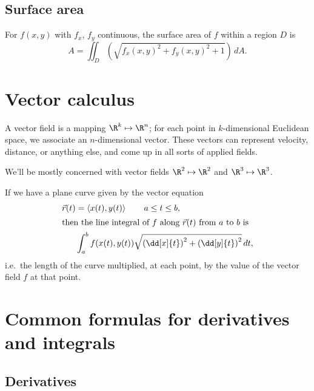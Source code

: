 \documentclass[knowledge]{rbt-mathnotes}
\begin{document}
\section{Surface area}

For $f(x,y)$ with $f_x$, $f_y$ continuous, the surface area of $f$ within
a region $D$ is
\[A = \iint_D \left(\sqrt{f_x(x,y)^2 + f_y(x,y)^2 + 1}\right) \,dA.\]


\chapter{Vector calculus}
A vector field is a mapping $\R^k \mapsto \R^n$; for each point in
$k$-dimensional Euclidean space, we associate an $n$-dimensional vector.
These vectors can represent velocity, distance, or anything else, and come
up in all sorts of applied fields.

We'll be mostly concerned with vector fields $\R^2\mapsto\R^2$ and
$\R^3\mapsto\R^3$.

If we have a plane curve given by the vector equation
\begin{alignat*}{1}
  \vec r(t) &= \left< x(t), y(t) \right> \qquad a \le t \le b, \\
\intertext{then the line integral of $f$ along $\vec r(t)$ from $a$ to $b$
is}
  & \int_a^b f(x(t), y(t)) \sqrt{{\left(\dd[x]{t}\right)}^2 +
  {\left(\dd[y]{t}\right)}^2}\,dt,
\end{alignat*}
i.e.\ the length of the curve multiplied, at each point, by the value of the
vector field $f$ at that point.


\appendix
\chapter{Common formulas for derivatives and integrals}
\backmatter
\section{Derivatives}
\end{document}
